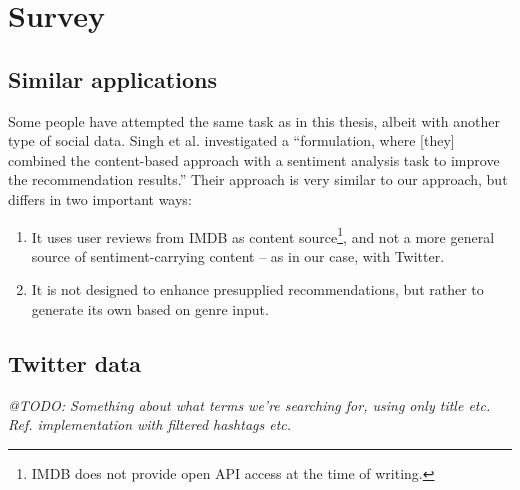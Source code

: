 
\chapter{Survey} %

\label{Chapter2} %




\section{Similar applications} %
\label{sec:similar_applications}

Some people have attempted the same task as in this thesis, albeit with another type of social data.
Singh et al. \cite{Singh2011} investigated a ``formulation, where [they] combined the content-based approach with a sentiment analysis task to improve the recommendation results.''
Their approach is very similar to our approach, but differs in two important ways:

\begin{enumerate}
  \item It uses user reviews from IMDB as content source\footnote{IMDB does not provide open API access at the time of writing.}, and not a more general source of sentiment-carrying content -- as in our case, with Twitter.
  \item It is not designed to enhance presupplied recommendations, but rather to generate its own based on genre input.
\end{enumerate}



\section{Twitter data} %
\label{sec:twitter_data}



\emph{@TODO: Something about what terms we're searching for, using only title etc. Ref. implementation with filtered hashtags etc.}

